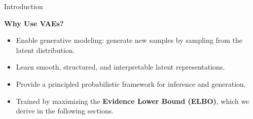 \begin{frame}[allowframebreaks]{Introduction}
\framebreak

\textbf{Why Use VAEs?}
\begin{itemize}
  \item Enable generative modeling: generate new samples by sampling from the latent distribution.
  \item Learn smooth, structured, and interpretable latent representations.
  \item Provide a principled probabilistic framework for inference and generation.
  \item Trained by maximizing the \textbf{Evidence Lower Bound (ELBO)}, which we derive in the following sections.
\end{itemize}

\end{frame}
